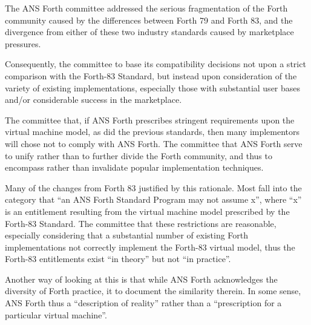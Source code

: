 The ANS Forth committee addressed the serious fragmentation of the
Forth community caused by the differences between Forth 79 and
Forth 83, and the divergence from either of these two industry
standards caused by marketplace pressures.

Consequently, the committee  to base its compatibility
decisions not upon a strict comparison with the Forth-83 Standard,
but instead upon consideration of the variety of existing
implementations, especially those with substantial user bases and/or
considerable success in the marketplace.

The committee  that, if ANS Forth prescribes stringent
requirements upon the virtual machine model, as did the previous
standards, then many implementors will chose not to comply with
ANS Forth. The committee  that ANS Forth  serve to unify
rather than to further divide the Forth community, and thus
 to encompass rather than invalidate popular implementation
techniques.

Many of the changes from Forth 83  justified by this rationale.
Most fall into the category that ``an ANS Forth Standard Program may
not assume x'', where ``x'' is an entitlement resulting from the
virtual machine model prescribed by the Forth-83 Standard. The
committee  that these restrictions are reasonable, especially
considering that a substantial number of existing Forth implementations
 not correctly implement the Forth-83 virtual model, thus the Forth-83
entitlements exist ``in theory'' but not ``in practice''.

Another way of looking at this is that while ANS Forth acknowledges
the diversity of  Forth practice, it  to document the
similarity therein. In some sense, ANS Forth  thus a ``description
of reality'' rather than a ``prescription for a particular virtual
machine''.



